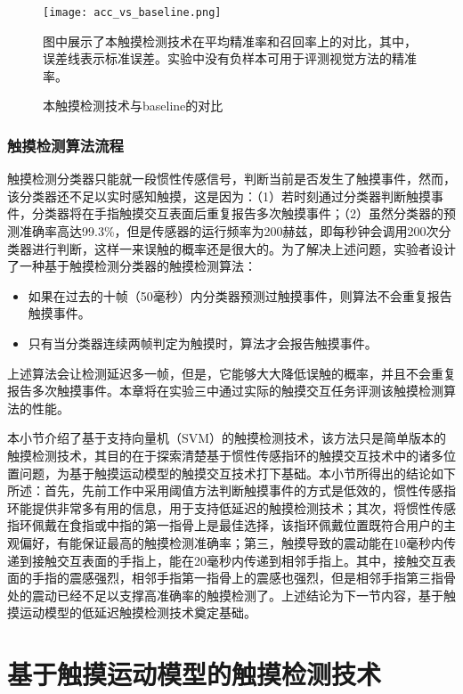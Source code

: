 \begin{figure}
	\centering
	\texttt{[image: acc\_vs\_baseline.png]}
	\caption*{图中展示了本触摸检测技术在平均精准率和召回率上的对比，其中，误差线表示标准误差。实验中没有负样本可用于评测视觉方法的精准率。}
	\caption{本触摸检测技术与baseline的对比}
	\label{fig:acc_vs_baseline}
\end{figure}

\subsubsection{触摸检测算法流程}

触摸检测分类器只能就一段惯性传感信号，判断当前是否发生了触摸事件，然而，该分类器还不足以实时感知触摸，这是因为：（1）若时刻通过分类器判断触摸事件，分类器将在手指触摸交互表面后重复报告多次触摸事件；（2）虽然分类器的预测准确率高达99.3\%，但是传感器的运行频率为200赫兹，即每秒钟会调用200次分类器进行判断，这样一来误触的概率还是很大的。为了解决上述问题，实验者设计了一种基于触摸检测分类器的触摸检测算法：

\begin{itemize}
\item 如果在过去的十帧（50毫秒）内分类器预测过触摸事件，则算法不会重复报告触摸事件。
\item 只有当分类器连续两帧判定为触摸时，算法才会报告触摸事件。
\end{itemize}

上述算法会让检测延迟多一帧，但是，它能够大大降低误触的概率，并且不会重复报告多次触摸事件。本章将在实验三中通过实际的触摸交互任务评测该触摸检测算法的性能。

本小节介绍了基于支持向量机（SVM）的触摸检测技术，该方法只是简单版本的触摸检测技术，其目的在于探索清楚基于惯性传感指环的触摸交互技术中的诸多位置问题，为基于触摸运动模型的触摸交互技术打下基础。本小节所得出的结论如下所述：首先，先前工作中采用阈值方法判断触摸事件的方式是低效的，惯性传感指环能提供非常多有用的信息，用于支持低延迟的触摸检测技术；其次，将惯性传感指环佩戴在食指或中指的第一指骨上是最佳选择，该指环佩戴位置既符合用户的主观偏好，有能保证最高的触摸检测准确率；第三，触摸导致的震动能在10毫秒内传递到接触交互表面的手指上，能在20毫秒内传递到相邻手指上。其中，接触交互表面的手指的震感强烈，相邻手指第一指骨上的震感也强烈，但是相邻手指第三指骨处的震动已经不足以支撑高准确率的触摸检测了。上述结论为下一节内容，基于触摸运动模型的低延迟触摸检测技术奠定基础。

\section{基于触摸运动模型的触摸检测技术}


